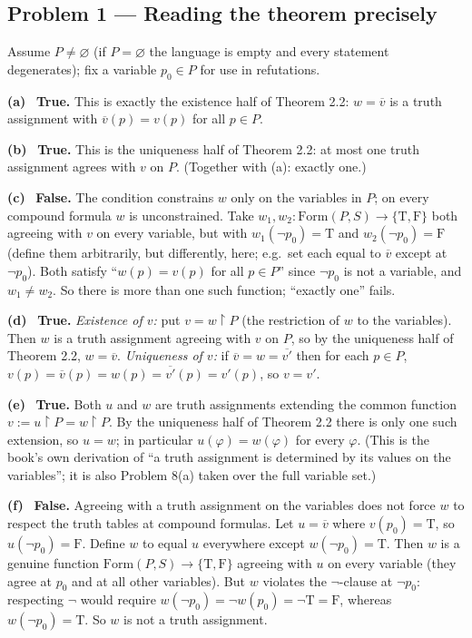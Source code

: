 \documentclass[11pt]{article}
\newcommand{\Form}{\mathrm{Form}}
\newcommand{\T}{\mathrm{T}}
\newcommand{\F}{\mathrm{F}}
\newcommand{\TF}{\{\T,\F\}}
\newcommand{\ext}[1]{\overline{#1}}
\newcommand{\solpart}[1]{\smallskip\noindent\textbf{(#1)}\ }
\newcommand{\prob}[2]{\subsection*{Problem #1 --- #2}}
\begin{document}
\prob{1}{Reading the theorem precisely}

Assume $P\neq\varnothing$ (if $P=\varnothing$ the language is empty and every
statement degenerates); fix a variable $p_0\in P$ for use in refutations.

\solpart{a} \textbf{True.} This is exactly the existence half of Theorem 2.2:
$w=\ext{v}$ is a truth assignment with $\ext{v}(p)=v(p)$ for all $p\in P$.

\solpart{b} \textbf{True.} This is the uniqueness half of Theorem 2.2: at most one
truth assignment agrees with $v$ on $P$. (Together with (a): exactly one.)

\solpart{c} \textbf{False.} The condition constrains $w$ only on the variables in
$P$; on every compound formula $w$ is unconstrained. Take $w_1,w_2\colon
\Form(P,S)\to\TF$ both agreeing with $v$ on every variable, but with
$w_1(\lnot p_0)=\T$ and $w_2(\lnot p_0)=\F$ (define them arbitrarily, but
differently, here; e.g.\ set each equal to $\ext{v}$ except at $\lnot p_0$). Both
satisfy ``$w(p)=v(p)$ for all $p\in P$'' since $\lnot p_0$ is not a variable, and
$w_1\ne w_2$. So there is more than one such function; ``exactly one'' fails.

\solpart{d} \textbf{True.} \emph{Existence of $v$:} put $v=w{\restriction}P$
(the restriction of $w$ to the variables). Then $w$ is a truth assignment agreeing
with $v$ on $P$, so by the uniqueness half of Theorem 2.2, $w=\ext{v}$.
\emph{Uniqueness of $v$:} if $\ext{v}=w=\ext{v'}$ then for each $p\in P$,
$v(p)=\ext{v}(p)=w(p)=\ext{v'}(p)=v'(p)$, so $v=v'$.

\solpart{e} \textbf{True.} Both $u$ and $w$ are truth assignments extending the
common function $v:=u{\restriction}P=w{\restriction}P$. By the uniqueness half of
Theorem 2.2 there is only one such extension, so $u=w$; in particular
$u(\varphi)=w(\varphi)$ for every $\varphi$. (This is the book's own derivation of
``a truth assignment is determined by its values on the variables''; it is also
Problem 8(a) taken over the full variable set.)

\solpart{f} \textbf{False.} Agreeing with a truth assignment on the variables does
not force $w$ to respect the truth tables at compound formulas. Let $u=\ext{v}$
where $v(p_0)=\T$, so $u(\lnot p_0)=\F$. Define $w$ to equal $u$ everywhere except
$w(\lnot p_0)=\T$. Then $w$ is a genuine function $\Form(P,S)\to\TF$ agreeing with
$u$ on every variable (they agree at $p_0$ and at all other variables). But $w$
violates the $\lnot$-clause at $\lnot p_0$: respecting $\lnot$ would require
$w(\lnot p_0)=\lnot w(p_0)=\lnot\T=\F$, whereas $w(\lnot p_0)=\T$. So $w$ is not a
truth assignment.
\end{document}
